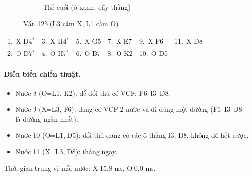 \begin{figure}[H]
\begin{subfigure}[t]{.48\linewidth}
    \caption{Thế cuối (ô xanh: dãy thắng)}
  \end{subfigure}
  \caption{Ván 125 (L3 cầm X, L1 cầm O).}
  \label{fig:cs-van-02}
\end{figure}
{\footnotesize\linespread{1}\selectfont
\noindent\begin{tabularx}{\linewidth}{*{6}{X}}
\toprule
1.~X D4$^\ast$ & 3.~X H4$^\ast$ & 5.~X G5 & 7.~X E7 & 9.~X F6 & 11.~X D8 \\
2.~O D7$^\ast$ & 4.~O H7$^\ast$ & 6.~O B7 & 8.~O K2 & 10.~O D5 &  \\
\bottomrule
\end{tabularx}\par}
\paragraph{Diễn biến chiến thuật.}
\begin{itemize}\footnotesize\linespread{1.1}\selectfont
\setlength{\itemsep}{0pt}
  \item Nước 8 (O=L1, K2): để đối thủ có VCF: F6--I3--D8.
  \item Nước 9 (X=L3, F6): đang có VCF 2 nước và đi đúng một đường (F6--I3--D8 là đường ngắn nhất).
  \item Nước 10 (O=L1, D5): đối thủ đang có các ô thắng I3, D8, không đỡ hết được.
  \item Nước 11 (X=L3, D8): thắng ngay.
\end{itemize}
Thời gian trung vị mỗi nước: X 15,8 ms, O 0,0 ms.
\clearpage

